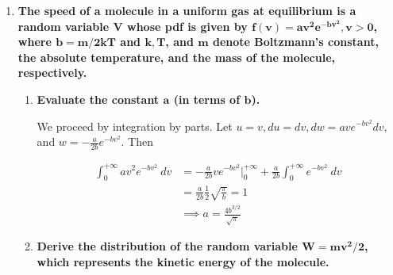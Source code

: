 \documentclass[10pt, oneside]{article}
\begin{document}
\begin{enumerate}[label=5.\arabic*]
Deriving the pdf of $P^*$:

\begin{align*}
G'(p^*) = g(p^*) &= \frac{1}{2} \Big( \frac{1}{2} \Big( \frac{p^*}{2}^{-1/2} \Big( \frac{1}{2} \Big) \Big) \\
&= \frac{1}{8} \Big( \frac{p^*}{2} \Big)^{-1/2} = \boxed{\frac{1}{8} \Big( \frac{2}{p^*} \Big)^{1/2}}
\end{align*}

For $P^* = 2I^2, 9 < I < 11$, we have $162 < P^* < 242$. Then $g(p^*) \geq 0$ and $\int^{242}_{162} \frac{1}{8} \Big( \frac{2}{p^*} \Big)^{1/2} \ dx = \boxed{1}$, ascertaining that $g(p^*)$ is a pdf.

\item  \begin{tcolorbox}[
  colback=Cerulean!5!white,
  colframe=Cerulean!75!black]
\textbf{The speed of a molecule in a uniform gas at equilibrium is a random variable $\bm{V}$ whose pdf is given by $\bm{f(v) = av^2 e^{-bv^2}, v > 0}$, where $\bm{b = m / 2kT}$ and $\bm{k, T}$, and $\bm{m}$ denote Boltzmann's constant, the absolute temperature, and the mass of the molecule, respectively.}
\end{tcolorbox}
	
	\begin{enumerate}
	\item  \begin{tcolorbox}[
	  colback=Cerulean!5!white,
	  colframe=Cerulean!75!black]
	\textbf{Evaluate the constant $\bm{a}$ (in terms of $\bm{b}$).}
	\end{tcolorbox}
	
	We proceed by integration by parts. Let $u = v, du = dv, dw = ave^{-bv^2} dv,$ and $w = -\frac{a}{2b} e^{-bv^2}$. Then
	
	\begin{align*}
	\int^{+\infty}_0 av^2 e^{-bv^2} \ dv &= - \frac{a}{2b} ve^{-bv^2} \Big|^{+\infty}_0 + \frac{a}{2b} \int^{+\infty}_0 e^{-bv^2} \ dv \\
	&= \frac{a}{2b} \frac{1}{2} \sqrt{ \frac{\pi}{b} } = 1 \\
	&\implies \boxed{a = \frac{4b^{3/2}}{\sqrt{\pi}}}
	\end{align*}
	
	\item  \begin{tcolorbox}[
	  colback=Cerulean!5!white,
	  colframe=Cerulean!75!black]
	\textbf{Derive the distribution of the random variable $\bm{W = mv^2 / 2}$, which represents the kinetic energy of the molecule.}
	\end{tcolorbox}
	

\end{enumerate}
\end{enumerate}
\end{document}
